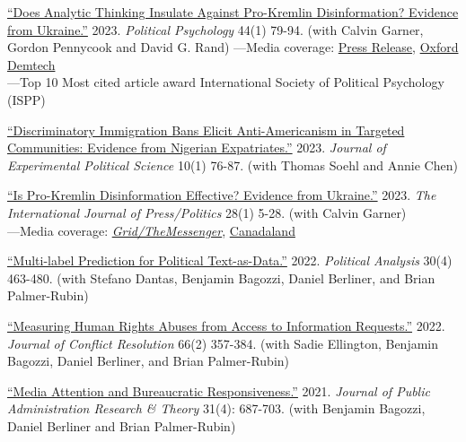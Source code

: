 \documentclass[margin,line]{res}
\begin{document}
\begin{etaremune}
{\item \href {https://psyarxiv.com/4yrdj}
  {``Does Analytic Thinking Insulate Against Pro-Kremlin Disinformation? Evidence from Ukraine.''} 2023. \textit{Political Psychology} 44(1) 79-94.	 (with Calvin Garner, Gordon Pennycook and David G. Rand) \newline
    ---Media coverage: \href{https://www.prnewswire.com/news-releases/ukrainians-who-engage-in-more-analytic-thinking-are-less-susceptible-to-russias-disinformation-campaign-301488184.html}{Press Release}, \href{https://web.archive.org/web/20240624183718/https://demtech.oii.ox.ac.uk/war-in-ukraine-and-disinformation-newsletter-29-march-2022/}{Oxford Demtech}\\
      ---Top 10 Most cited article award International Society of Political Psychology (ISPP)

  \item \href{https://doi.org/10.1017/XPS.2021.26}{``Discriminatory Immigration Bans Elicit Anti-Americanism in Targeted Communities: Evidence from Nigerian Expatriates.''} 2023. \textit{Journal of Experimental Political Science} 10(1) 76-87.  (with Thomas Soehl and Annie Chen)

  \item \href{https://doi.org/10.1177/19401612211045221}{``Is Pro-Kremlin Disinformation Effective? Evidence from Ukraine.''} 2023. \textit{The International Journal of Press/Politics} 28(1) 5-28.  (with Calvin Garner)\\
    ---Media coverage: \href{https://web.archive.org/web/20240110204946/https://themessenger.com/grid/autopsied-bodies-and-false-flags-how-pro-russian-disinformation-spreads-chaos-in-ukraine}{\textit{Grid/TheMessenger}}, \href{https://www.canadaland.com/podcast/760-russias-weapons-of-mass-deception/}{Canadaland}

\item \href{https://www.doi.org/10.1017/pan.2021.15}{``Multi-label Prediction for Political Text-as-Data.''} 2022. \textit{Political Analysis} 30(4) 463-480. (with  Stefano Dantas, Benjamin Bagozzi, Daniel Berliner, and Brian Palmer-Rubin)

\item \href{https://journals.sagepub.com/doi/10.1177/00220027211035553}{``Measuring Human Rights Abuses from Access to Information Requests.''} 2022. \textit{Journal of Conflict Resolution} 66(2) 357-384. (with Sadie Ellington, Benjamin Bagozzi, Daniel Berliner, and Brian Palmer-Rubin)

\item \href{https://doi.org/10.1093/jopart/muab001}{``Media Attention and Bureaucratic Responsiveness.''} 2021. \textit{Journal of Public Administration Research \& Theory}  31(4): 687-703. (with Benjamin Bagozzi, Daniel Berliner and Brian Palmer-Rubin)

}
\end{etaremune}
\end{document}
